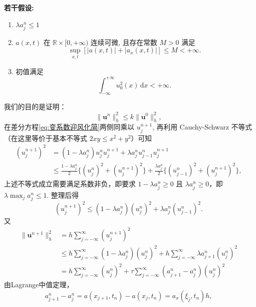 \textbf{若干假设:}
\begin{enumerate}[(1)]
    \item $\lambda a_j^n\leq 1$
    \item $a(x,t)$ 在 $\mathbb{R} \times [0, +\infty)$ 连续可微, 且存在常数 $M > 0$ 满足
    \begin{equation}\label{eq:assumption-a}
        \sup_{x,t} [|a(x,t)| + |a_x(x,t)|] \leq M < +\infty.
    \end{equation}
    \item 初值满足
    \begin{equation*}
        \int_{-\infty}^{+\infty} u_0^2(x) \,\mathrm{d}x < +\infty.
    \end{equation*}
\end{enumerate}

我们的目的是证明：
\begin{equation}
    \|\bm{u}^n\|_h^2 \leq k\|\bm{u}^0\|_h^2,
\end{equation}
在差分方程\eqref{eq:变系数迎风化简}两侧同乘以 $u_j^{n+1}$, 再利用 Cauchy-Schwarz 不等式（在这里等价于基本不等式 $2xy \le x^2 + y^2$）可知
\begin{equation*}
    \begin{aligned}
        (u_j^{n+1})^2 &= (1 - \lambda a_j^n)u_j^n u_j^{n+1} + \lambda a_j^n u_{j-1}^n u_j^{n+1} \\
        &\leq \frac{1 - \lambda a_j^n}{2} \{ (u_j^n)^2 + (u_j^{n+1})^2 \} + \frac{\lambda a_j^n}{2} \{ (u_{j-1}^n)^2 + (u_j^{n+1})^2 \},
    \end{aligned}
\end{equation*}
上述不等式成立需要满足系数非负，即要求 $1 - \lambda a_j^n \geq 0$ 且 $\lambda a_j^n \geq 0$，即$\lambda \max_{j} a_j^n \leq 1$. 整理后得
\begin{equation*}
    (u_j^{n+1})^2 \leq (1 - \lambda a_j^n)(u_j^n)^2 + \lambda a_j^n(u_{j-1}^n)^2.
\end{equation*}
又
\begin{align*}
    \|\bm{u}^{n+1}\|_h^2 &= h\sum_{j=-\infty}^\infty (u_j^{n+1})^2 \\
    &\leq h\sum_{j=-\infty}^\infty  (1 - \lambda a_j^n)(u_j^n)^2 + h\sum_{j=-\infty}^\infty \lambda a_{j+1}^n(u_{j}^n)^2  \\
    &=h\sum_{j=-\infty}^\infty (u_j^n)^2 + \tau\sum_{j=-\infty}^\infty (a_{j+1}^n - a_j^n)(u_j^n)^2 
\end{align*}
由Lagrange中值定理，
\begin{equation*}
    a_{j+1}^n - a_j^n = a(x_{j+1}, t_n) - a(x_j, t_n) = a_x(\xi_j, t_n)h,
\end{equation*}
